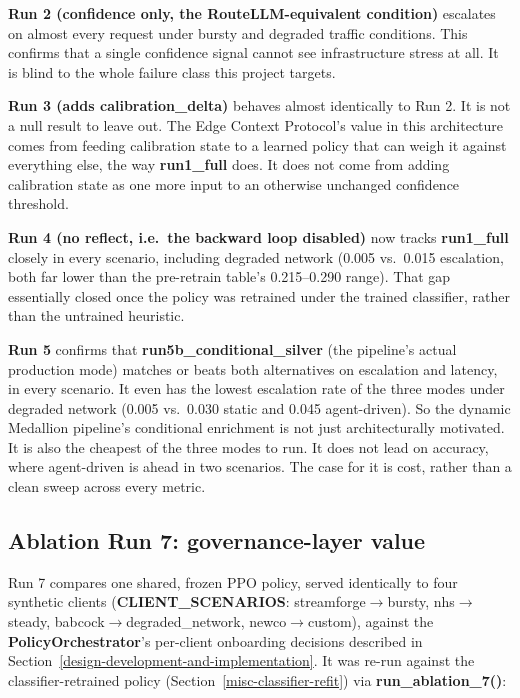 \textbf{Run 2 (confidence only, the RouteLLM-equivalent condition)}
escalates on almost every request under bursty and degraded traffic conditions.
This confirms that a single confidence signal cannot see
infrastructure stress at all. It is blind to the whole failure class
this project targets.

\textbf{Run 3 (adds calibration\_delta)} behaves almost identically to
Run 2. It is not a null result to leave out.
The Edge Context Protocol's value in this architecture
comes from feeding calibration state to a learned policy that can
weigh it against everything else, the way \textbf{run1\_full} does. It
does not come from adding calibration state as one more input to an
otherwise unchanged confidence threshold.

\textbf{Run 4 (no reflect, i.e.\ the backward loop disabled)} now
tracks \textbf{run1\_full} closely in every scenario, including
degraded network (0.005 vs.\ 0.015 escalation, both far lower than the
pre-retrain table's 0.215--0.290 range). That gap essentially closed
once the policy was retrained under the trained classifier, rather
than the untrained heuristic.

\textbf{Run 5} confirms that \textbf{run5b\_conditional\_silver} (the
pipeline's actual production mode) matches or beats both alternatives
on escalation and latency, in every scenario. It even has the lowest
escalation rate of the three modes under degraded network (0.005 vs.\
0.030 static and 0.045 agent-driven). So the dynamic Medallion
pipeline's conditional enrichment is not just architecturally
motivated. It is also the cheapest of the three modes to run. It does
not lead on accuracy, where agent-driven is ahead in two scenarios. The
case for it is cost, rather than a clean sweep across every metric.

\hypertarget{ablation-run-7}{%
\subsection{Ablation Run 7: governance-layer
value}\label{ablation-run-7}}

Run 7 compares one shared, frozen PPO policy, served identically to
four synthetic clients (\textbf{CLIENT\_SCENARIOS}:
streamforge$\to$bursty, nhs$\to$steady,
babcock$\to$degraded\_network, newco$\to$custom), against the
\textbf{PolicyOrchestrator}'s per-client onboarding decisions described
in Section~\ref{design-development-and-implementation}. It was re-run against the classifier-retrained policy
(Section~\ref{misc-classifier-refit}) via \textbf{run\_ablation\_7()}:

